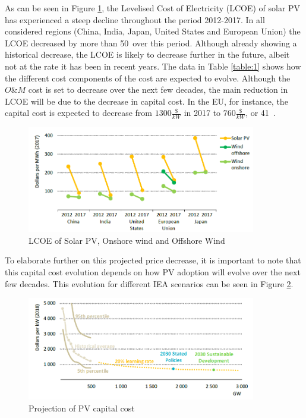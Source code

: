 \newline \newline \noindent
As can be seen in Figure \ref{Figure:1}, the Levelised Cost of Electricity (LCOE) of solar PV has experienced a steep decline throughout the period 2012-2017. In all considered regions (China, India, Japan, United States and European Union) the LCOE decreased by more than 50\  over this period. Although already showing a historical decrease, the LCOE is likely to decrease further in the future, albeit not at the rate it has been in recent years. The data in Table \ref{table:1} shows how the different cost components of the cost are expected to evolve. Although the $O\&M$ cost is set to decrease over the next few decades, the main reduction in LCOE will be due to the decrease in capital cost. In the EU, for instance, the capital cost is expected to decrease from $1300\frac{\$}{kW}$ in 2017 to $760 \frac{\$}{kW}$, or 41\ .
\begin{figure}[h!]
\centering
\includegraphics[width=10cm]{LCOE.PNG}
\caption[LCOE of Solar PV, Onshore wind and Offshore Wind]{LCOE of Solar PV, Onshore wind and Offshore Wind \cite{WEO}}
\label{Figure:1}
\end{figure}
\noindent
\newline 
\newline
To elaborate further on this projected price decrease, it is important to note that this capital cost evolution depends on how PV adoption will evolve over the next few decades. This evolution for different IEA scenarios can be seen in Figure \ref{Figure:adopt}.
\begin{figure}[h!]
\centering
\includegraphics[width=10cm]{PVadoption.PNG}
\caption[Projection of PV capital cost]{Projection of PV capital cost \cite{WEO20}}
\label{Figure:adopt}
\end{figure}
